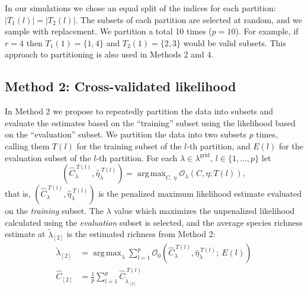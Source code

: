 \documentclass[12pt]{article}
\DeclareMathOperator*{\argmax}{arg\,max}
\newcommand{\lambdagrid}{\lambda^{\text{grid}}}
\begin{document}
In our simulations we chose an equal split of the indices for each partition: $|T_1(l)| = |T_2(l)|$.  The subsets of each partition are selected at random, and we sample with replacement.  We partition a total 10 times ($p = 10$).  For example, if $r = 4$ then $T_1(1) = \{1,4\}$ and $T_2(1) = \{2, 3\}$ would be valid subsets.  This approach to partitioning is also used in Methods 2 and 4.

\subsection{Method 2: Cross-validated likelihood}


In Method 2 we propose to repeatedly partition the data into subsets and evaluate the estimates based on the ``training'' subset using the likelihood based on the ``evaluation'' subset.
We partition the data into two subsets $p$ times, calling them $T(l)$ for the training subset of the $l$-th partition, and $E(l)$ for the evaluation subset of the $l$-th partition. For each $\lambda \in \lambdagrid$, $l \in \{1, \dots , p\}$ let
\begin{equation}
\left(\widehat{C}_{\lambda}^{ \ T(l)}, \widehat{\eta}_{\lambda}^{ \ T(l)} \right) = \argmax_{C, \, \eta} \mathcal{O}_\lambda \left(C, \eta; T(l) \right), \label{eq:part_c_hats_method_2}
\end{equation}
that is, $\left(\widehat{C}_{\lambda}^{ \ T(l)}, \widehat{\eta}_{\lambda}^{ \ T(l)} \right)$ is the penalized maximum likelihood estimate evaluated on the \textit{training} subset.  The $\lambda$ value which maximizes the unpenalized likelihood calculated using the \textit{evaluation} subset is selected, and the average species richness estimate at $\widetilde{\lambda}_{[2]}$ is the estimated richness from Method 2:
\begin{align}
\widetilde{\lambda}_{[2]} &= \argmax_\lambda \sum_{l=1}^p \mathcal{O}_0\left( \widehat{C}_{\lambda}^{ \ T(l)}, \widehat{\eta}_{\lambda}^{ \ T(l)} ; \  E(l) \right) \label{eq:selected_lambda_2} \\
\widehat{C}_{[2]} &= \frac{1}{p} \sum_{l=1}^p \widehat{C}_{\widetilde{\lambda}_{[2]}}^{ \ T(l)}
\end{align}
\end{document}
